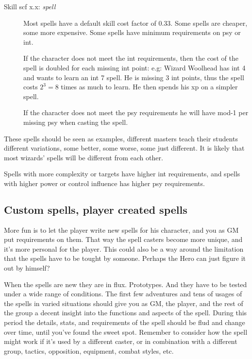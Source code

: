 \begin{description}

\item[Skill scf x.x: \emph{spell}] Most spells have a default skill cost factor of 0.33. Some spells are cheaper, some more expensive. Some spells have minimum requirements on psy or int. 

If the character does not meet the int requirements, then the cost of the spell is doubled for each missing int point: e.g: Wizard Woolhead has int 4 and wants to learn an int 7 spell. He is missing 3 int points, thus the spell costs $2^3=8$ times as much to learn. He then spends his xp on a simpler spell.

If the character does not meet the psy requirements he will have mod-1 per missing psy when casting the spell.

\end{description}

These spells should be seen as examples, different masters teach their students different variations, some better, some worse, some just different. It is likely that most wizards' spells will be different from each other.

Spells with more complexity or targets have higher int requirements, and spells with higher power or control influence has higher psy requirements.

\subsection*{Custom spells, player created spells}
More fun is to let the player write new spells for his character, and you as GM put requirements on them. That way the spell casters become more unique, and it's more personal for the player. This could also be a way around the limitation that the spells have to be tought by someone. Perhaps the Hero can just figure it out by himself?

When the spells are new they are in flux. Prototypes. And they have to be tested under a wide range of conditions. The first few adventures and tens of usages of the spells in varied situations should give you as GM, the player, and the rest of the group a decent insight into the functions and aspects of the spell. During this period the details, stats, and requirements of the spell should be flud and change over time, until you've found the sweet spot. Remember to consider how the spell might work if it's used by a different caster, or in combination with a different group, tactics, opposition, equipment, combat styles, etc.







